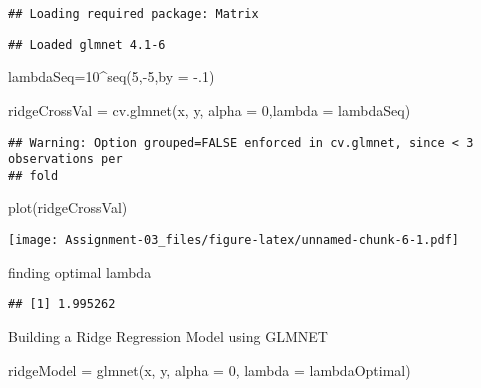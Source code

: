 \documentclass[
]{article}
\newenvironment{Shaded}{\begin{snugshade}}{\end{snugshade}}
\newcommand{\AttributeTok}[1]{\textcolor[rgb]{0.77,0.63,0.00}{#1}}
\newcommand{\CommentTok}[1]{\textcolor[rgb]{0.56,0.35,0.01}{\textit{#1}}}
\newcommand{\DecValTok}[1]{\textcolor[rgb]{0.00,0.00,0.81}{#1}}
\newcommand{\FunctionTok}[1]{\textcolor[rgb]{0.00,0.00,0.00}{#1}}
\newcommand{\NormalTok}[1]{#1}
\newcommand{\OtherTok}[1]{\textcolor[rgb]{0.56,0.35,0.01}{#1}}
\newcommand{\SpecialCharTok}[1]{\textcolor[rgb]{0.00,0.00,0.00}{#1}}
\begin{document}
\begin{verbatim}
## Loading required package: Matrix
\end{verbatim}

\begin{verbatim}
## Loaded glmnet 4.1-6
\end{verbatim}

\begin{Shaded}
\begin{Highlighting}[]
\NormalTok{lambdaSeq}\OtherTok{=}\DecValTok{10}\SpecialCharTok{\^{}}\FunctionTok{seq}\NormalTok{(}\DecValTok{5}\NormalTok{,}\SpecialCharTok{{-}}\DecValTok{5}\NormalTok{,}\AttributeTok{by =} \SpecialCharTok{{-}}\NormalTok{.}\DecValTok{1}\NormalTok{)}


\NormalTok{ridgeCrossVal }\OtherTok{=} \FunctionTok{cv.glmnet}\NormalTok{(x, y, }\AttributeTok{alpha =} \DecValTok{0}\NormalTok{,}\AttributeTok{lambda =}\NormalTok{ lambdaSeq)}
\end{Highlighting}
\end{Shaded}

\begin{verbatim}
## Warning: Option grouped=FALSE enforced in cv.glmnet, since < 3 observations per
## fold
\end{verbatim}

\begin{Shaded}
\begin{Highlighting}[]
\FunctionTok{plot}\NormalTok{(ridgeCrossVal)}
\end{Highlighting}
\end{Shaded}

\texttt{[image: Assignment-03\_files/figure-latex/unnamed-chunk-6-1.pdf]}

finding optimal lambda

\begin{Shaded}
\end{Shaded}

\begin{verbatim}
## [1] 1.995262
\end{verbatim}

Building a Ridge Regression Model using GLMNET

\begin{Shaded}
\begin{Highlighting}[]
\NormalTok{ridgeModel }\OtherTok{=} \FunctionTok{glmnet}\NormalTok{(x, y, }\AttributeTok{alpha =} \DecValTok{0}\NormalTok{, }\AttributeTok{lambda  =}\NormalTok{ lambdaOptimal)}
\end{Highlighting}
\end{Shaded}
\end{document}
